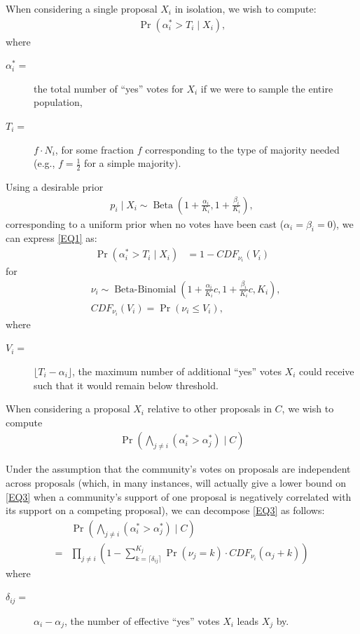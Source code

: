 \documentclass[format=acmsmall, review=true, screen=true, anonymous=true]{acmart}
\begin{document}
When considering a single proposal $X_i$ in isolation, we wish to compute:
\begin{align}\label{EQ1}
\Pr(\alpha^*_i > T_i \mid X_i),
\end{align}
where
\begin{description}
\item[$\alpha^*_i = $] the total number of ``yes'' votes for $X_i$ if we were to sample the entire
population,
\item[$T_i = $] $f \cdot N_i$, for some fraction $f$ corresponding to the type of majority needed
(e.g., $f=\frac{1}{2}$ for a simple majority).
\end{description}
Using a desirable prior
\begin{align}\label{EQ2}
p_i \mid X_i \sim \operatorname{Beta}(1+\frac{\alpha_i}{K_i},1+\frac{\beta_i}{K_i}),
\end{align}
corresponding to a uniform prior when no votes have been cast ($\alpha_i = \beta_i = 0$), we can
express \eqref{EQ1} as:
\begin{align}\label{EQ3}
\Pr(\alpha^*_i > T_i \mid X_i) &= 1 - {CDF}_{\nu_i}(V_i)
\end{align}
for
\begin{align*}
&\nu_i \sim \operatorname{Beta-Binomial}(1 + \frac{\alpha_i}{K_i}c, 1 + \frac{\beta_i}{K_i}c, K_i),\\
&{CDF}_{\nu_i}(V_i)  = \Pr(\nu_i \leq V_i),
\end{align*}
where
\begin{description}
\item[$V_i = $] $\lfloor{T_i - \alpha_i}\rfloor$, the maximum number of additional ``yes''
votes $X_i$ could receive such that it would remain below threshold.
\end{description}

When considering a proposal $X_i$ relative to other proposals in $C$, we wish to compute
\begin{align}\label{EQ4}
\Pr\left(\bigwedge_{j \neq i} (\alpha^*_i > \alpha^*_j) \mid C\right)
\end{align}

Under the assumption that the community's votes on proposals are independent across proposals
(which, in many instances, will actually give a lower bound on \eqref{EQ3} when a community's
support of one proposal is negatively correlated with its support on a competing proposal),
we can decompose \eqref{EQ3} as follows:
\begin{align}\label{EQ5}
& \Pr\left(\bigwedge_{j \neq i} (\alpha^*_i > \alpha^*_j) \mid C\right) \nonumber \\
= & \prod_{j \neq i}\left(1 - \sum_{k=\lceil\delta_{ij}\rceil}^{K_j} \Pr(\nu_j = k) \cdot {CDF}_{\nu_i}(\alpha_j + k) \right)
\end{align}
where
\begin{description}
\item[$\delta_{ij} = $] $\alpha_i - \alpha_j$, the number of effective ``yes'' votes $X_i$
leads $X_j$ by.
\end{description}
\end{document}
